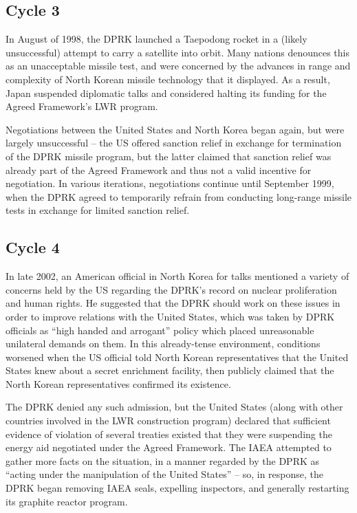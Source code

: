 \documentclass{article}
\begin{document}
\subsection{Cycle 3}

In August of 1998, the DPRK launched a Taepodong rocket in a (likely unsuccessful) attempt to carry a satellite into orbit\cite{orfall}. Many nations denounces this as an unacceptable missile test, and were concerned by the advances in range and complexity of North Korean missile technology that it displayed\cite{orfall}. As a result, Japan suspended diplomatic talks and considered halting its funding for the Agreed Framework’s LWR program\cite{orfall}.

Negotiations between the United States and North Korea began again, but were largely unsuccessful – the US offered sanction relief in exchange for termination of the DPRK missile program, but the latter claimed that sanction relief was already part of the Agreed Framework and thus not a valid incentive for negotiation\cite{davenport}. In various iterations, negotiations continue until September 1999, when the DPRK agreed to temporarily refrain from conducting long-range missile tests in exchange for limited sanction relief\cite{davenport}.

\subsection{Cycle 4}

In late 2002, an American official in North Korea for talks mentioned a variety of concerns held by the US regarding the DPRK’s record on nuclear proliferation and human rights\cite{davenport}. He suggested that the DPRK should work on these issues in order to improve relations with the United States, which was taken by DPRK officials as “high handed and arrogant” policy which placed unreasonable unilateral demands on them\cite{kcna3}. In this already-tense environment, conditions worsened when the US official told North Korean representatives that the United States knew about a secret enrichment facility, then publicly claimed that the North Korean representatives confirmed its existence\cite{davenport}. 

The DPRK denied any such admission, but the United States (along with other countries involved in the LWR construction program) declared that sufficient evidence of violation of several treaties existed that they were suspending the energy aid negotiated under the Agreed Framework\cite{iaea09}. The IAEA attempted to gather more facts on the situation, in a manner regarded by the DPRK as “acting under the manipulation of the United States”\cite{hurriyet} – so, in response, the DPRK began removing IAEA seals, expelling inspectors, and generally restarting its graphite reactor program\cite{iaea09}.
\end{document}
